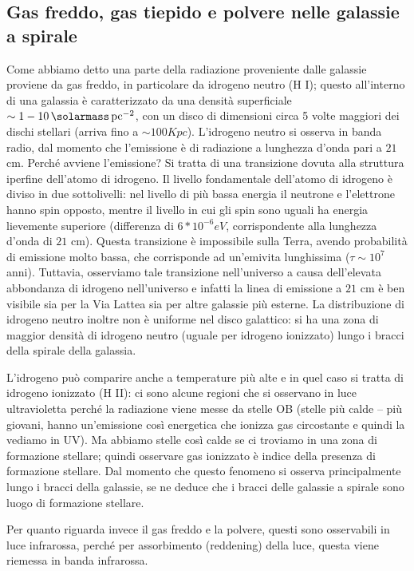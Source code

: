 \subsection{Gas freddo, gas tiepido e polvere nelle galassie a spirale}
Come abbiamo detto una parte della radiazione proveniente dalle galassie proviene da gas freddo, in particolare da idrogeno neutro (H I); questo all'interno di una galassia è caratterizzato da una densità superficiale $ \sim 1 -\SI{10}{\solarmass.pc^{-2}}$, con un disco di dimensioni circa 5 volte maggiori dei dischi stellari (arriva fino a $\sim 100 Kpc$). L'idrogeno neutro si osserva in banda radio, dal momento che l'emissione è di radiazione a lunghezza d’onda pari a $21$ cm. Perché avviene l'emissione? Si tratta di una transizione dovuta alla struttura iperfine dell’atomo di idrogeno. Il livello fondamentale dell’atomo di idrogeno è diviso in due sottolivelli: nel livello di più bassa energia il neutrone e l’elettrone hanno spin opposto, mentre il livello in cui gli spin sono uguali ha energia lievemente superiore (differenza di $6*10^{-6}eV$, corrispondente alla lunghezza d’onda di $21$ cm). Questa transizione è impossibile sulla Terra, avendo probabilità di emissione molto bassa, che corrisponde ad un'emivita lunghissima ($\tau \sim 10^7$ anni). Tuttavia, osserviamo tale transizione nell’universo a causa dell’elevata abbondanza di idrogeno nell’universo e infatti la linea di emissione a $21$ cm è ben visibile sia per la Via Lattea sia per altre galassie più esterne. La distribuzione di idrogeno neutro inoltre non è uniforme nel disco galattico: si ha una zona di maggior densità di idrogeno neutro (uguale per idrogeno ionizzato) lungo i bracci della spirale della galassia. 

L'idrogeno può comparire anche a temperature più alte e in quel caso si tratta di idrogeno ionizzato (H II): ci sono alcune regioni che si osservano in luce ultravioletta perché la radiazione viene messe da stelle OB (stelle più calde – più giovani, hanno un'emissione così energetica che ionizza gas circostante e quindi la vediamo in UV). Ma abbiamo stelle così calde se ci troviamo in una zona di formazione stellare; quindi osservare gas ionizzato è indice della presenza di formazione stellare. Dal momento che questo fenomeno si osserva principalmente lungo i bracci della galassie, se ne deduce che i bracci delle galassie a spirale sono luogo di formazione stellare. 

Per quanto riguarda invece il gas freddo e la polvere, questi sono osservabili in luce infrarossa, perché per assorbimento (reddening) della luce, questa viene riemessa in banda infrarossa. 
